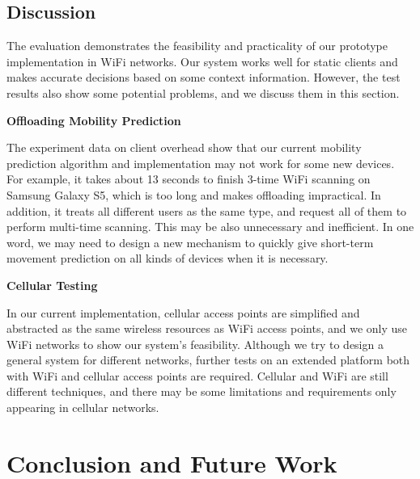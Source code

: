 \documentclass[english]{tktltiki}
\begin{document}
\subsection{Discussion}

The evaluation demonstrates the feasibility and practicality of our prototype implementation in WiFi networks. Our system works well for static clients and makes accurate decisions based on some context information. However, the test results also show some potential problems, and we discuss them in this section.

\vspace{1mm}

\textbf{Offloading Mobility Prediction}

\vspace{1mm}

The experiment data on client overhead show that our current mobility prediction algorithm and implementation may not work for some new devices. For example, it takes about 13 seconds to finish 3-time WiFi scanning on Samsung Galaxy S5, which is too long and makes offloading impractical. In addition, it treats all different users as the same type, and request all of them to perform multi-time scanning. This may be also unnecessary and inefficient. In one word, we may need to design a new mechanism to quickly give short-term movement prediction on all kinds of devices when it is necessary.

\vspace{1mm}

\textbf{Cellular Testing}

\vspace{1mm}

In our current implementation, cellular access points are simplified and abstracted as the same wireless resources as WiFi access points, and we only use WiFi networks to show our system's feasibility. Although we try to design a general system for different networks, further tests on an extended platform both with WiFi and cellular access points are required. Cellular and WiFi are still different techniques, and there may be some limitations and requirements only appearing in cellular networks. 



\newpage

\section{Conclusion and Future Work}
\end{document}
